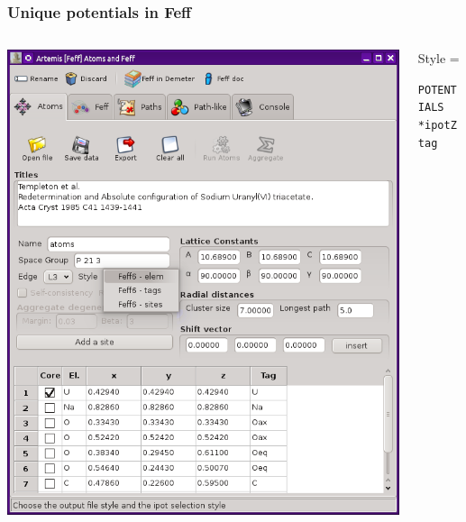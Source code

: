 \documentclass[10pt, xcolor=x11names, compress]{beamer}
\begin{document}
\begin{frame}[fragile]
  \frametitle{Unique potentials in Feff}
  \begin{columns}[T]
    \begin{column}{0.5\linewidth}
      \includegraphics[width=0.9\linewidth]{images/atoms.png}
    \end{column}
    \begin{column}{0.5\linewidth}
      Style = \\
      \vspace{-2ex}
      \begin{block}{}
        \tiny\begin{alltt}
 {\color{SteelBlue4}POTENTIALS}
  {\color{Blue4}* ipot   Z      tag}
        \end{alltt}
        \vspace{-9ex}
      \end{block}

\end{column}
\end{columns}
\end{frame}
\end{document}
